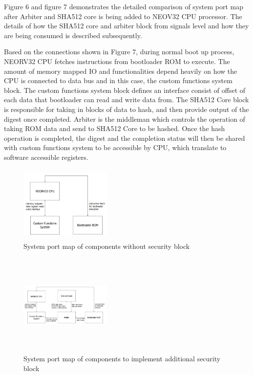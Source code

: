 \documentclass[a4paper,fleqn]{cas-dc}
\begin{document}
Figure 6 and figure 7 demonstrates the detailed comparison of system port map after Arbiter and SHA512 core is being added to NEOV32 CPU processor. The details of how the SHA512 core and arbiter block from signals level and how they are being consumed is described subsequently.

Based on the connections shown in Figure 7, during normal boot up process, NEORV32 CPU fetches instructions from bootloader ROM to execute. The amount of memory mapped IO and functionalities depend heavily on how the CPU is connected to data bus and in this case, the custom functions system block. The custom functions system block defines an interface consist of offset of each data that bootloader can read and write data from. The SHA512 Core block is responsible for taking in blocks of data to hash, and then provide output of the digest once completed. Arbiter is the middleman which controls the operation of taking ROM data and send to SHA512 Core to be hashed. Once the hash operation is completed, the digest and the completion status will then be shared with custom functions system to be accessible by CPU, which translate to software accessible registers.

\begin{figure}[hbt!]
	\centering
	\includegraphics[width=0.4\textwidth,height=1.5in]{figs/SystemPortMap-Original.JPG}
	\caption{System port map of components without security block}
\end{figure}

\begin{figure}[hbt!]
	\centering
	\includegraphics[width=0.4\textwidth,height=2in]{figs/SystemPortMap-Amended.JPG}
	\caption{System port map of components to implement additional security block}
\end{figure}
\end{document}

